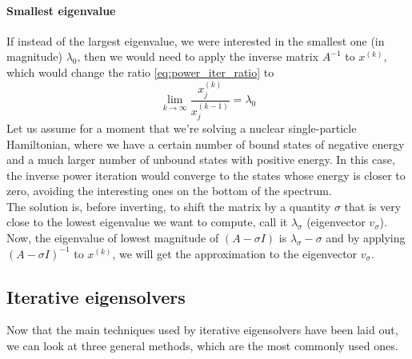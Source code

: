 \paragraph{Smallest eigenvalue}
If instead of the largest eigenvalue, we were interested in the smallest one (in magnitude) $\lambda_0$, then we would need to apply the inverse matrix $A^{-1}$ to $x^{(k)}$, which would change the ratio \eqref{eq:power_iter_ratio} to 
\begin{equation}
    \label{eq:power_iter_ratio_inv}
    \lim_{k\to\infty} \frac{x_j^{(k)}}{x_j^{(k-1)}} = \lambda_0
\end{equation}
Let us assume for a moment that we're solving a nuclear single-particle Hamiltonian, where we have a certain number of bound states of negative energy and a much larger number of unbound states with positive energy. In this case, the inverse power iteration would converge to the states whose energy is closer to zero, avoiding the interesting ones on the bottom of the spectrum.
\\The solution is, before inverting, to shift the matrix by a quantity $\sigma$ that is very close to the lowest eigenvalue we want to compute, call it $\lambda_\sigma$ (eigenvector $v_\sigma$).
Now, the eigenvalue of lowest magnitude of $(A-\sigma I)$ is $\lambda_\sigma - \sigma$ and by applying $(A-\sigma I)^{-1}$ to $x^{(k)}$, we will get the approximation to the eigenvector $v_\sigma$.
\subsection{Iterative eigensolvers}
\label{sec:eigensolvers}
Now that the main techniques used by iterative eigensolvers have been laid out, we can look at three general methods, which are the most commonly used ones.
